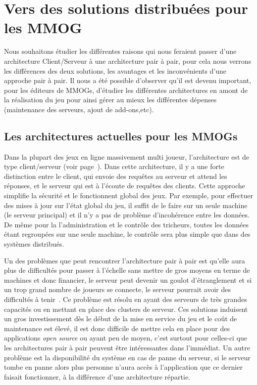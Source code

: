 \section{Vers des solutions distribuées pour les MMOG}
	\label{whyp2p}
	Nous souhaitons étudier les différentes raisons qui nous feraient passer d'une architecture Client/Serveur à une architecture pair à pair, pour cela nous verrons les différences des deux solutions, les avantages et les inconvénients d'une approche pair à pair. Il nous a été possible d'observer qu'il est devenu important, pour les éditeurs de MMOGs, d'étudier les différentes architectures en amont de la réalisation du jeu pour ainsi gérer au mieux les différentes dépenses ~\cite{14101410} (maintenance des serveurs, ajout de add-ons,etc).
	\subsection{Les architectures actuelles pour les MMOGs}
	\par Dans la plupart des jeux en ligne massivement multi joueur, l'architecture est de type client/serveur (voir page~\pageref{P2P/ClServ}). Dans cette architecture, il y a une forte distinction entre le client, qui envoie des requêtes au serveur et attend les réponses, et le serveur qui est à l'écoute de requêtes des clients. Cette approche simplifie la sécurité et le fonctionnent global des jeux. Par exemple, pour effectuer des mises à jour sur l'état global du jeu, il suffit de le faire sur un seule machine (le serveur principal) et il n'y a pas de problème d'incohérence entre les données. De même pour la l'administration et le contrôle des tricheurs, toutes les données étant regroupées sur une seule machine, le contrôle sera plus simple que dans des systèmes distribués. \\
	\par Un des problèmes que peut rencontrer l'architecture pair à pair est qu'elle aura plus de difficultés pour passer à l'échelle sans mettre de gros moyens en terme de machines et donc financier, le serveur peut devenir un goulot d'étranglement et si un trop grand nombre de joueurs se connecte, le serveur pourrait avoir des difficultés à tenir~\cite{1198269}. Ce problème est résolu en ayant des serveurs de très grandes capacités ou en mettant en place des clusters de serveur. Ces solutions induisent un gros investissement dès le début de la mise en service du jeu et le coût de maintenance est élevé, il est donc difficile de mettre cela en place pour des applications \textit{open source} ou ayant peu de moyen, c'est surtout pour celles-ci que les architectures pair à pair peuvent être intéressantes dans l'immédiat. Un autre problème est la disponibilité du système en cas de panne du serveur, si le serveur tombe en panne alors plus personne n'aura accès à l'application que ce dernier faisait fonctionner, à la différence d'une architecture répartie. \\
